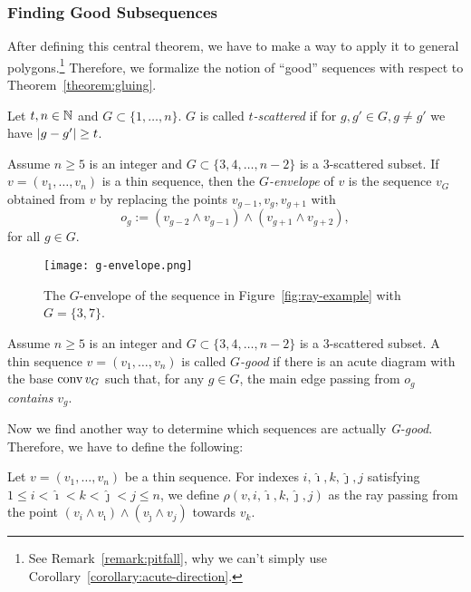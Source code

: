 \subsubsection{Finding Good Subsequences}

After defining this central theorem, we have to make a way to apply it to general polygons.\footnote{See Remark~\ref{remark:pitfall}, why we can't simply use Corollary~\ref{corollary:acute-direction}.}
Therefore, we formalize the notion of ``good'' sequences with respect to Theorem~\ref{theorem:gluing}.

\begin{definition}
  Let $t, n \in \mathbb{N}$ and $G \subset \{1,\dots,n\}$. $G$ is called $t$\emph{-scattered} if for $g, g' \in G, g \neq g'$ we have $\lvert g-g'\rvert \geq t$.
\end{definition}

\begin{definition}[G-envelope]\label{definition:g-envelope}
  Assume $n\geq 5$ is an integer and $G\subset\{3,4,\dots,n-2\}$ is a $3$-scattered subset. If $v=(v_1,\dots,v_n)$ is a thin sequence, then the $G$\emph{-envelope} of $v$ is the sequence $v_G$ obtained from $v$ by replacing the points $v_{g-1}, v_g, v_{g+1}$ with $$o_g:=(v_{g-2}\wedge v_{g-1})\wedge (v_{g+1}\wedge v_{g+2}),$$ for all $g\in G$.
\end{definition}

\begin{figure}[ht]
  \centering
  \texttt{[image: g-envelope.png]}
  \caption{The $G$-envelope of the sequence in Figure~\ref{fig:ray-example} with $G=\{3,7\}$. \cite[Figure~6]{shitov2020sublinear}}
  \label{fig:g-envelope}
\end{figure}

\begin{definition}[G-good]
  Assume $n\geq 5$ is an integer and $G\subset\{3,4,\dots,n-2\}$ is a $3$-scattered subset. A thin sequence $v=(v_1,\dots,v_n)$ is called $G$\emph{-good} if there is an acute diagram with the base $\operatorname{conv} v_G$ such that, for any $g\in G$, the main edge passing from $o_g$ \emph{contains} $v_g$.
\end{definition}

Now we find another way to determine which sequences are actually \emph{G-good}. Therefore, we have to define the following:

\begin{definition}
  Let $v=(v_1,\dots,v_n)$ be a thin sequence. For indexes $i,\hat{\imath},k, \hat{\jmath}, j$ satisfying $1\leq i<\hat{\imath}<k<\hat{\jmath}<j\leq n$, we define $\rho(v,i,\hat{\imath},k, \hat{\jmath}, j)$ as the ray passing from the point $(v_i\wedge v_{\hat{\imath}})\wedge(v_{\hat{\jmath}}\wedge v_j)$ towards $v_k$. 
\end{definition}

